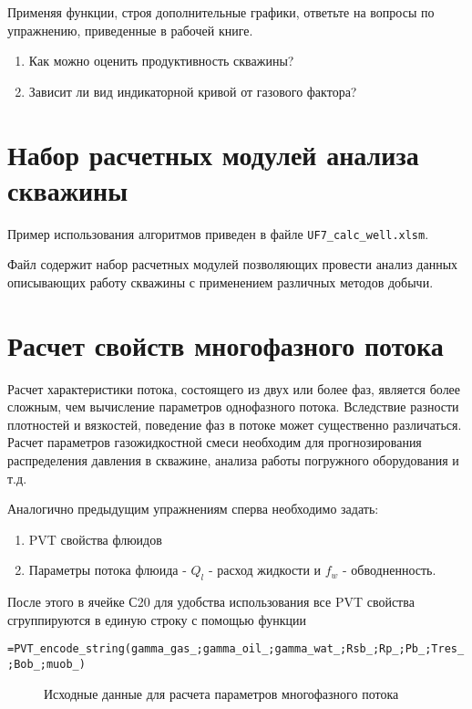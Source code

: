 Применяя функции, строя дополнительные графики, ответьте на вопросы по упражнению, приведенные в рабочей книге.

	\begin{enumerate}
		\item Как можно оценить продуктивность скважины?
		\item Зависит ли вид индикаторной кривой от газового фактора?
	\end{enumerate}

\section{Набор расчетных модулей анализа скважины}
Пример использования алгоритмов \unf   приведен в файле \texttt{UF7\_calc\_well.xlsm}.

Файл содержит набор расчетных модулей позволяющих провести анализ данных описывающих работу скважины с применением различных методов добычи.

\section{Расчет свойств многофазного потока}

Расчет характеристики потока, состоящего из двух или более фаз, является более сложным, чем вычисление параметров однофазного потока. Вследствие разности плотностей и вязкостей, поведение фаз в потоке может существенно различаться. Расчет параметров газожидкостной смеси необходим для прогнозирования распределения давления в скважине, анализа работы погружного оборудования и т.д.
 
Аналогично предыдущим упражнениям сперва необходимо задать:
	\begin{enumerate}
		\item PVT свойства флюидов
		\item Параметры потока флюида - $Q_{l}$ - расход жидкости и $f_{w}$ - обводненность.
	\end{enumerate}
После этого в ячейке С20 для удобства использования все PVT свойства сгруппируются в единую строку с помощью функции

{ \small  \texttt{=PVT\_encode\_string(gamma\_gas\_;gamma\_oil\_;gamma\_wat\_;Rsb\_;Rp\_;Pb\_;Tres\_;Bob\_;muob\_)}}

\begin{figure}[h!]
	\center{\texttt{[image: Ex30\_1]}}
	\caption{Исходные данные для расчета параметров многофазного потока}
	\label{ris:Ex30_1}
\end{figure}

